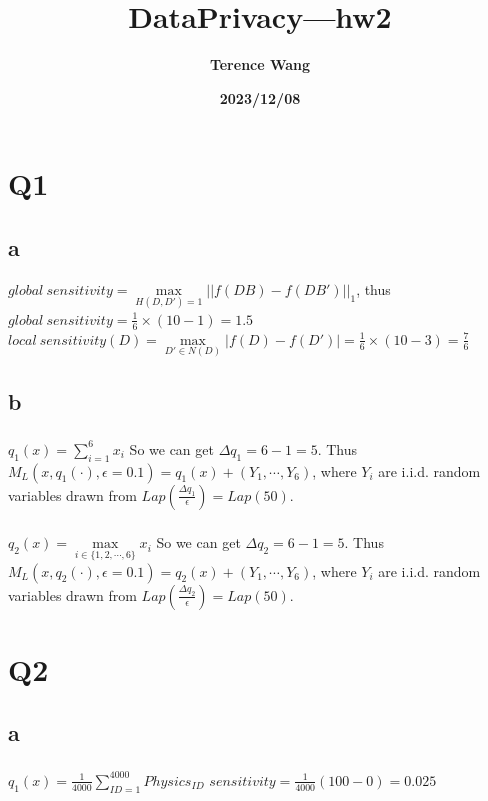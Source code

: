 \documentclass[12pt]{article}
\title{\textbf{DataPrivacy—hw2}}
\author{\textbf{Terence Wang}}%
\date{\textbf{2023/12/08}}%
\begin{document}
\maketitle
\tableofcontents
\newpage

\section{Q1}
\subsection{a}
$global\ sensitivity=\max\limits_{H(D,D')=1}||f(DB)-f(DB')||_1$, thus $global\ sensitivity=\frac{1}{6}\times (10-1)=1.5$
\newline
$local\ sensitivity(D)=\max\limits_{D'\in N(D)}|f(D)-f(D')|=\frac{1}{6}\times (10-3)=\frac{7}{6}$
\subsection{b}
\subsubsection{}
$q_1(x)=\sum\limits_{i=1}^{6}x_i$
\newline
So we can get $\Delta q_1=6-1=5$. Thus $M_L(x, q_1(\cdot), \epsilon=0.1)=q_1(x)+(Y_1,\cdots, Y_6)$, where $Y_i$ are i.i.d. random variables drawn from $Lap(\frac{\Delta q_1}{\epsilon})=Lap(50)$.
\subsubsection{}
$q_2(x)=\max\limits_{i\in \{1,2,\cdots,6\}}x_i$
\newline
So we can get $\Delta q_2=6-1=5$. Thus $M_L(x, q_2(\cdot), \epsilon=0.1)=q_2(x)+(Y_1,\cdots, Y_6)$, where $Y_i$ are i.i.d. random variables drawn from $Lap(\frac{\Delta q_2}{\epsilon})=Lap(50)$.

\section{Q2}
\subsection{a}
\subsubsection{}
$q_1(x)=\frac{1}{4000}\sum\limits_{ID=1}^{4000}Physics_{ID}$
\newline
$sensitivity=\frac{1}{4000}(100-0)=0.025$
\end{document}
